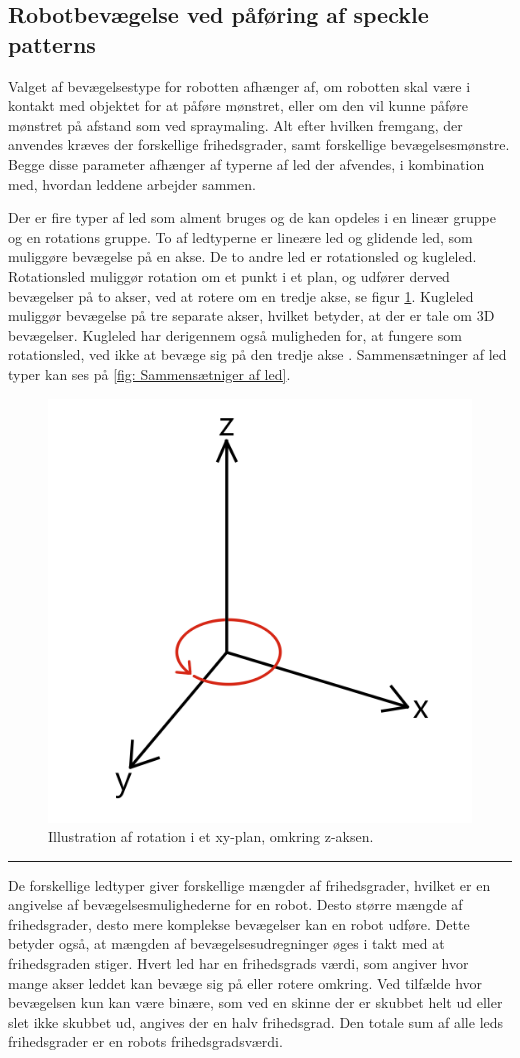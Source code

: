 \subsection{Robotbevægelse ved påføring af speckle patterns} \label{Robotbevægelse ved påføring af speckle patterns}

Valget af bevægelsestype for robotten afhænger af, om robotten skal være i kontakt med objektet for at påføre mønstret, eller om den vil kunne påføre mønstret på afstand som ved spraymaling. Alt efter hvilken fremgang, der anvendes kræves der forskellige frihedsgrader, samt forskellige bevægelsesmønstre. Begge disse parameter afhænger af typerne af led der afvendes, i kombination med, hvordan leddene arbejder sammen.


Der er fire typer af led som alment bruges og de kan opdeles i en lineær gruppe og en rotations gruppe. To af ledtyperne er lineære led og glidende led, som muliggøre bevægelse på en akse. De to andre led er rotationsled og kugleled. Rotationsled muliggør rotation om et punkt i et plan, og udfører derved bevægelser på to akser, ved at rotere om en tredje akse, se figur \ref{fig:rotation i planet}. Kugleled muliggør bevægelse på tre separate akser, hvilket betyder, at der er tale om 3D bevægelser. Kugleled har derigennem også muligheden for, at fungere som rotationsled, ved ikke at bevæge sig på den tredje akse \parencite{Niku2020IntroductionApplications}. Sammensætninger af led typer kan ses på \ref{fig: Sammensætniger af led}.

\begin{figure} [H]
    \centering
    \includegraphics[width=0.4\linewidth]{Sections/2 Problemanalyse/Media/Rotation i planet.png}
    \caption{Illustration af rotation i et xy-plan, omkring z-aksen.}
    \label{fig:rotation i planet}
\end{figure} \plainbreak{-0.5}

De forskellige ledtyper giver forskellige mængder af frihedsgrader, hvilket er en angivelse af bevægelsesmulighederne for en robot. Desto større mængde af frihedsgrader, desto mere komplekse bevægelser kan en robot udføre. Dette betyder også, at mængden af bevægelsesudregninger øges i takt med at frihedsgraden stiger. Hvert led har en frihedsgrads værdi, som angiver hvor mange akser leddet kan bevæge sig på eller rotere omkring. Ved tilfælde hvor bevægelsen kun kan være binære, som ved en skinne der er skubbet helt ud eller slet ikke skubbet ud, angives der en halv frihedsgrad. Den totale sum af alle leds frihedsgrader er en robots frihedsgradsværdi.


